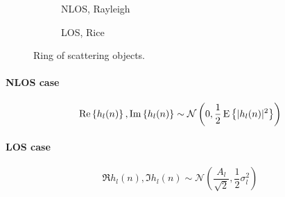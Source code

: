 \begin{figure}
	\centering
	\begin{subfigure}{.45\linewidth}
		\skelfig
		\caption{NLOS, Rayleigh}
	\end{subfigure}
	\hskip 5mm
	\begin{subfigure}{.45\linewidth}
		\skelfig
		\caption{LOS, Rice}
	\end{subfigure}
	\caption{
		Ring of scattering objects.
		\label{fig:multipath-statistical-models}
	}
\end{figure}

\paragraph{NLOS case}

\begin{equation}
	\mathrm{Re} \left\{h_l(n)\right\}, \mathrm{Im} \left\{h_l(n)\right\}
	\sim \mathcal{N} \left(0, \frac{1}{2} \operatorname{E} \left\{|h_l(n)|^2\right\} \right)
\end{equation}
\skelpar[4]

\paragraph{LOS case}

\begin{equation}
	\Re{h_l(n)}, \Im{h_l(n)}
	\sim \mathcal{N} \left( \frac{A_l}{\sqrt{2}}, \frac{1}{2} \sigma_l^2 \right)
\end{equation}
\skelpar[4]
